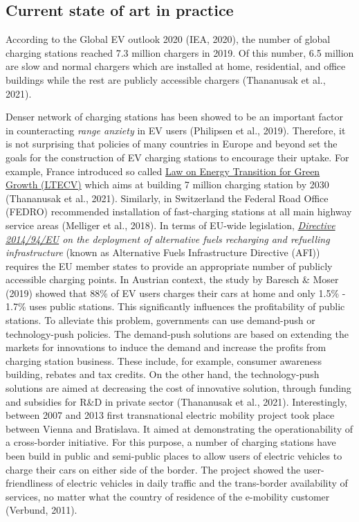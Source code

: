 \documentclass[
]{book}
\begin{document}
\hypertarget{current-state-of-art-in-practice-7}{%
\subsection*{Current state of art in practice}\label{current-state-of-art-in-practice-7}}

According to the Global EV outlook 2020 (IEA, 2020), the number of global charging stations reached 7.3 million chargers in 2019. Of this number, 6.5 million are slow and normal chargers which are installed at home, residential, and office buildings while the rest are publicly accessible chargers (Thananusak et al., 2021).

Denser network of charging stations has been showed to be an important factor in counteracting \emph{range anxiety} in EV users (Philipsen et al., 2019). Therefore, it is not surprising that policies of many countries in Europe and beyond set the goals for the construction of EV charging stations to encourage their uptake. For example, France introduced so called \href{https://www.iea.org/policies/8737-law-on-energy-transition-for-green-growth-ltecv}{Law on Energy Transition for Green Growth (LTECV)} which aims at building 7 million charging station by 2030 (Thananusak et al., 2021). Similarly, in Switzerland the Federal Road Office (FEDRO) recommended installation of fast-charging stations at all main highway service areas (Melliger et al., 2018). In terms of EU-wide legislation, \emph{\href{https://eur-lex.europa.eu/legal-content/EN/TXT/HTML/?uri=CELEX:32014L0094\&from=en}{Directive 2014/94/EU} on the deployment of alternative fuels recharging and refuelling infrastructure} (known as Alternative Fuels Infrastructure Directive (AFI)) requires the EU member states to provide an appropriate number of publicly accessible charging points.
In Austrian context, the study by Baresch \& Moser (2019) showed that 88\% of EV users charges their cars at home and only 1.5\% - 1.7\% uses public stations. This significantly influences the profitability of public stations. To alleviate this problem, governments can use demand-push or technology-push policies. The demand-push solutions are based on extending the markets for innovations to induce the demand and increase the profits from charging station business. These include, for example, consumer awareness building, rebates and tax credits. On the other hand, the technology-push solutions are aimed at decreasing the cost of innovative solution, through funding and subsidies for R\&D in private sector (Thananusak et al., 2021).
Interestingly, between 2007 and 2013 first transnational electric mobility project took place between Vienna and Bratislava. It aimed at demonstrating the operationability of a cross-border initiative. For this purpose, a number of charging stations have been build in public and semi-public places to allow users of electric vehicles to charge their cars on either side of the border. The project showed the user-friendliness of electric vehicles in daily traffic and the trans-border availability of services, no matter what the country of residence of the e-mobility customer (Verbund, 2011).
\end{document}
